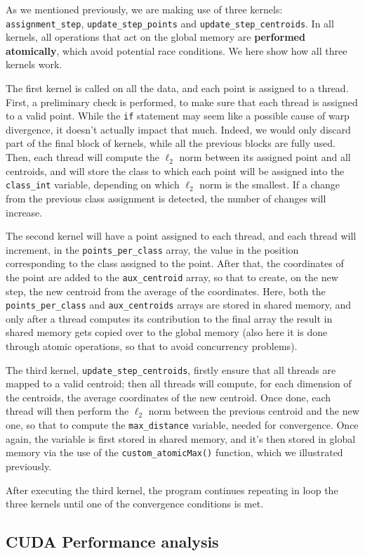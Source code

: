 \documentclass[11pt, journal]{IEEEtran}
\newcommand{\nwl}{

\vspace{11pt}

}
\begin{document}
As we mentioned previously, we are making use of three kernels: \verb|assignment_step|, \verb|update_step_points| and \verb|update_step_centroids|. In all kernels, all operations that act on the global memory are \textbf{performed atomically}, which avoid potential race conditions. We here show how all three kernels work.
\nwl
The first kernel is called on all the data, and each point is assigned to a thread. First, a preliminary check is performed, to make sure that each thread is assigned to a valid point. While the \verb|if| statement may seem like a possible cause of warp divergence, it doesn't actually impact that much. Indeed, we would only discard part of the final block of kernels, while all the previous blocks are fully used. Then, each thread will compute the $\ell_2$ norm between its assigned point and all centroids, and will store the class to which each point will be assigned into the \verb|class_int| variable, depending on which $\ell_2$ norm is the smallest. If a change from the previous class assignment is detected, the number of changes will increase.
\nwl
The second kernel will have a point assigned to each thread, and each thread will increment, in the \verb|points_per_class| array, the value in the position corresponding to the class assigned to the point. After that, the coordinates of the point are added to the \verb|aux_centroid| array, so that to create, on the new step, the new centroid from the average of the coordinates. Here, both the \verb|points_per_class| and \verb|aux_centroids| arrays are stored in shared memory, and only after a thread computes its contribution to the final array the result in shared memory gets copied over to the global memory (also here it is done through atomic operations, so that to avoid concurrency problems).
\nwl
The third kernel, \verb|update_step_centroids|, firstly ensure that all threads are mapped to a valid centroid; then all threads will compute, for each dimension of the centroids, the average coordinates of the new centroid. Once done, each thread will then perform the $\ell_2$ norm between the previous centroid and the new one, so that to compute the \verb|max_distance| variable, needed for convergence. Once again, the variable is first stored in shared memory, and it's then stored in global memory via the use of the \verb|custom_atomicMax()| function, which we illustrated previously.
\nwl
After executing the third kernel, the program continues repeating in loop the three kernels until one of the convergence conditions is met.

\subsection{CUDA Performance analysis}
\end{document}
